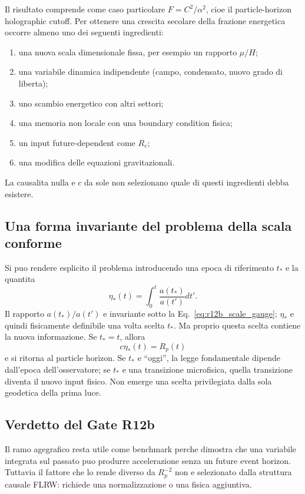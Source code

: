 \documentclass[11pt,a4paper]{article}
\begin{document}
Il risultato comprende come caso particolare $F=C^2/\alpha^2$, cioe il particle-horizon holographic cutoff. Per ottenere una crescita secolare della frazione energetica occorre almeno uno dei seguenti ingredienti:
\begin{enumerate}
\item una nuova scala dimensionale fissa, per esempio un rapporto $\mu/H$;
\item una variabile dinamica indipendente (campo, condensato, nuovo grado di liberta);
\item uno scambio energetico con altri settori;
\item una memoria non locale con una boundary condition fisica;
\item un input future-dependent come $R_e$;
\item una modifica delle equazioni gravitazionali.
\end{enumerate}
La causalita nulla e $c$ da sole non selezionano quale di questi ingredienti debba esistere.

\subsection{Una forma invariante del problema della scala conforme}

Si puo rendere esplicito il problema introducendo una epoca di riferimento $t_*$ e la quantita
\begin{equation}
 \eta_*(t)=\int_0^t\frac{a(t_*)}{a(t')}dt'.
\end{equation}
Il rapporto $a(t_*)/a(t')$ e invariante sotto la Eq.~\eqref{eq:r12b_scale_gauge}; $\eta_*$ e quindi fisicamente definibile una volta scelta $t_*$. Ma proprio questa scelta contiene la nuova informazione. Se $t_*=t$, allora
\begin{equation}
 c\eta_*(t)=R_p(t)
\end{equation}
e si ritorna al particle horizon. Se $t_*$ e ``oggi'', la legge fondamentale dipende dall'epoca dell'osservatore; se $t_*$ e una transizione microfisica, quella transizione diventa il nuovo input fisico. Non emerge una scelta privilegiata dalla sola geodetica della prima luce.

\subsection{Verdetto del Gate R12b}

Il ramo agegrafico resta utile come benchmark perche dimostra che una variabile integrata sul passato puo produrre accelerazione senza un future event horizon. Tuttavia il fattore che lo rende diverso da $R_p^{-2}$ non e selezionato dalla struttura causale FLRW: richiede una normalizzazione o una fisica aggiuntiva.
\end{document}
